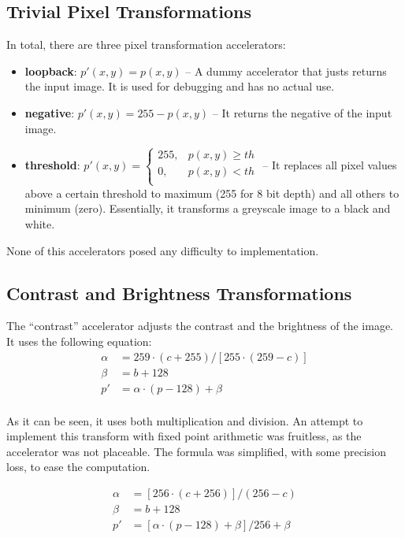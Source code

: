 \subsection{Trivial Pixel Transformations}

In total, there are three pixel transformation accelerators:

\begin{itemize}
\item	\textbf{loopback}: $p'(x,y)=p(x,y)$ -- A dummy accelerator that justs returns the input image.
	It is used for debugging and has no actual use.
\item	\textbf{negative}: $p'(x,y) = 255 - p(x,y)$ -- It returns the negative of the input image.
\item	\textbf{threshold}: 
	$ p'(x,y) = \left\{
	\begin{array}{ll}
		255, 	& p(x,y) \geq th\\
		0,	& p(x,y) < th\\
	\end{array} 
	\right. 
	$ -- It replaces all pixel values above a certain threshold to maximum (255 for 8 bit
	depth) and all others to minimum (zero). Essentially, it transforms a greyscale
	image to a black and white.
\end{itemize}
None of this accelerators posed any difficulty to implementation.

\subsection{Contrast and Brightness Transformations}
\label{sec:contrast}

The ``contrast'' accelerator adjusts the contrast and the brightness of the image.
It uses the following equation:
\[
\begin{array}{ll}
	\alpha	&= 259 \cdot (c + 255) / \left[ 255 \cdot (259 - c) \right] \\
	\beta	&= b + 128\\
	p' &= \alpha \cdot ( p - 128) + \beta\\
\end{array}
\]

As it can be seen, it uses both multiplication and division. An attempt to implement this
transform with fixed point arithmetic was fruitless, as the accelerator was not
placeable. The formula was simplified, with some precision loss, to ease the computation.

\[
\begin{array}{ll}
	\alpha &= \left[ 256 \cdot (c+256)  \right] / (256 - c) \\
	\beta &= b + 128\\
	p' &= \left[ \alpha \cdot (p - 128) + \beta \right] / 256 + \beta\\
\end{array}
\]

